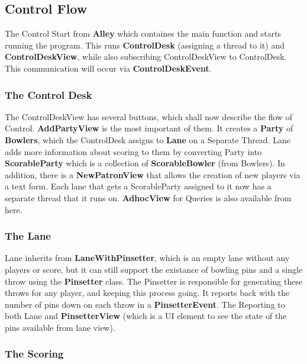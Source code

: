 \subsection{Control Flow}

The Control Start from \textbf{Alley} which containes the main function and starts running the program. This runs \textbf{ControlDesk} (assigning a thread to it) and \textbf{ControlDeskView}, while also subscribing ControlDeskView to ControlDesk. This communication will occur via \textbf{ControlDeskEvent}.

\subsubsection{The Control Desk}

The ControlDeskView has several buttons, which shall now describe the flow of Control. \textbf{AddPartyView} is the most important of them. It creates a \textbf{Party} of \textbf{Bowlers}, which the ControlDesk assigns to \textbf{Lane} on a Separate Thread. Lane adds more information about scoring to them by converting Party into \textbf{ScorableParty} which is a collection of \textbf{ScorableBowler} (from Bowlers). In addition, there is a \textbf{NewPatronView} that allows the creation of new players via a text form. Each lane that gets a ScorableParty assigned to it now has a separate thread that it runs on. \textbf{AdhocView} for Queries is also available from here.

\subsubsection{The Lane}

Lane inherits from \textbf{LaneWithPinsetter}, which is an empty lane without any players or score, but it can still support the existance of bowling pins and a single throw using the \textbf{Pinsetter} class. The Pinsetter is responsible for generating these throws for any player, and keeping this process going. It reports back with the number of pins down on each throw in a \textbf{PinsetterEvent}. The Reporting to both Lane and \textbf{PinsetterView} (which is a UI element to see the state of the pins available from lane view).

\subsubsection{The Scoring}

